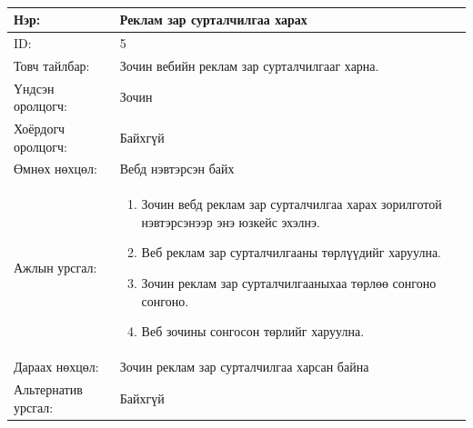 \begin{center}
	\begin{table}[!htbp]
		\caption{}
		\begin{tabular}{|p{4cm}|p{11cm}|}
			\hline
			Нэр: & Реклам зар сурталчилгаа харах  \\
			\hline
			ID: & 5 \\
			\hline
			Товч тайлбар: & Зочин вебийн реклам зар сурталчилгааг харна.  \\
			\hline
			Үндсэн оролцогч: & Зочин \\
			\hline
			Хоёрдогч оролцогч: & Байхгүй  \\
			\hline
			Өмнөх нөхцөл: &  Вебд нэвтэрсэн байх \\
			\hline
			Ажлын урсгал: &  \begin{enumerate}
								\item Зочин вебд реклам зар сурталчилгаа харах зорилготой нэвтэрсэнээр энэ юзкейс эхэлнэ.
								\item Веб реклам зар сурталчилгааны төрлүүдийг харуулна. 
								\item Зочин реклам зар сурталчилгааныхаа төрлөө сонгоно сонгоно.
								\item Веб зочины сонгосон төрлийг харуулна.  
							\end{enumerate}	 \\
						\hline
			Дараах нөхцөл: & Зочин реклам зар сурталчилгаа харсан байна \\
			\hline 
			Альтернатив урсгал: & Байхгүй \\
			\hline
		\end{tabular}
	\end{table}
\end{center}

